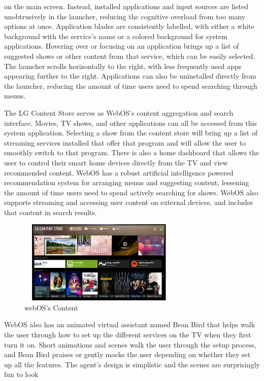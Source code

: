 \documentclass[12pt, letterpaper]{article}
\begin{document}
on the main screen.  Instead, installed applications and input sources are listed unobtrusively in the launcher, reducing the cognitive overload from too many options at once. Application blades are consistently labelled, with either a white background with the service's name or a colored background for system applications. Hovering over or focusing on an application brings up 
a list of suggested shows or other content from that service, which can be easily selected. The launcher scrolls horizontally to the right, with less frequently used apps 
appearing further to the right.  Applications can also be uninstalled directly from the launcher, reducing the amount of time users need to spend searching through menus.

The LG Content Store serves as WebOS's content aggregation and search interface.  Movies, TV shows, and other applications can all be accessed from this system application. Selecting a show from the content store will bring up a list of streaming services installed that offer that program and will allow the user to smoothly switch to that program.
There is also a home dashboard that allows the user to control their smart home devices directly from the TV and view recommended content.  WebOS has a robust artificial intelligence powered recommendation system for arranging menus and suggesting content, lessening the amount of time users need to spend actively searching for shows. WebOS also supports streaming and accessing user content on external devices,
and includes that content in search results.
\begin{figure}
    \centering
    \includegraphics[width=0.7\textwidth]{main_visual_1_ch1.png}
    \caption{webOS's Content }
\end{figure}
\newpage
WebOS also has an animated virtual assistant named Bean Bird that helps walk the user through how to set up the different services on the TV when they first turn it on.  Short animations and scenes walk the user through the setup process, and Bean Bird praises or gently mocks the user depending on whether they set up all the features.  The agent's design is simplistic and the scenes are surprisingly fun to look 
\end{document}

